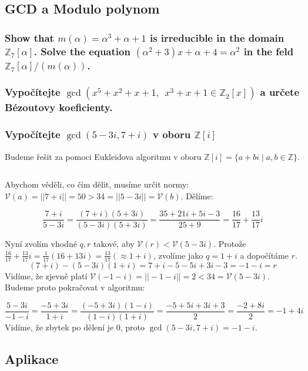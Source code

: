 \documentclass[10pt,a4paper]{article}
\newcommand{\Z}{{\mathbb{Z}}}       %
\begin{document}
\subsection{GCD a Modulo polynom}
\subsubsection{Show that $m(\alpha) = \alpha^3 + \alpha + 1$ is irreducible in the domain $\Z_7 [\alpha]$. Solve the equation $(\alpha^2 + 3)x + \alpha + 4 = \alpha^2$ in the feld $\Z_7 [\alpha]/(m(\alpha))$.}
\subsubsection{Vypočítejte $\gcd(x^5 + x^2 + x + 1, ~~x^3 + x + 1 \in \Z_2[x])$ a určete Bézoutovy koeficienty.}
\subsubsection{Vypočítejte $\gcd(5 - 3i, 7 + i)$ v oboru $\Z[i]$}

Budeme řešit za pomoci Eukleidova algoritmu v oboru $\Z[i] = \{a+bi \mid a,b\in \Z\}$.

$ $

Abychom věděli, co čím dělit, musíme určit normy: $\mathcal{V}(a)=||7+i|| = 50 > 34 = ||5-3i|| = \mathcal{V}(b)$. Dělíme:

\[
    \frac{7+i}{5-3i} = \frac{(7+i)(5+3i)}{(5-3i)(5+3i)} = \frac{35 + 21i + 5i-3}{25+9} = \frac{16}{17} + \frac{13}{17}i
\]

Nyní zvolím vhodné $q,r$ takové, aby $\mathcal{V}(r) < \mathcal{V}(5-3i)$. Protože $\frac{16}{17} + \frac{13}{17}i = \frac{1}{17}(16 + 13i) = \frac{13}{17}(\approx1 + i)$, zvolíme jako $q = 1+i$ a dopočítáme $r$.
\[
    (7+i) - (5-3i)(1+i) = 7+i - 5 -5i + 3i -3 = -1 -i = r
\]
Vidíme, že zjevně platí $\mathcal{V}(-1-i) = ||-1-i||= 2 < 34 =\mathcal{V}(5-3i)$. Budeme proto pokračovat v algoritmu:

\[
    \frac{5-3i}{-1-i} = \frac{-5+3i}{1+i} = \frac{(-5+3i)(1-i)}{(1-i)(1+i)} = \frac{-5+5i+3i+3}{2} = \frac{-2+8i}{2} = -1+4i
\]
Vidíme, že zbytek po dělení je $0$, proto $\gcd(5 - 3i, 7 + i)=-1-i$.


\subsection{Aplikace}
\end{document}
